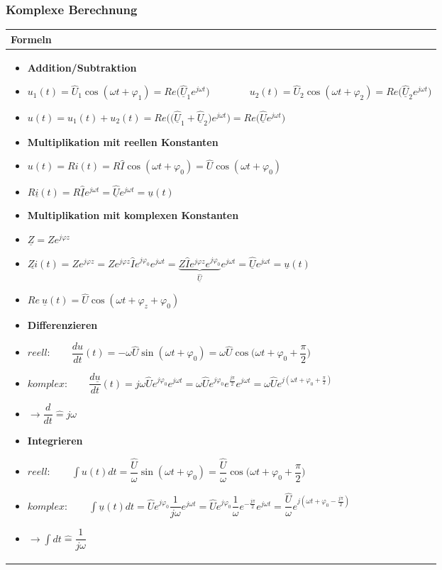 \subsubsection{Komplexe Berechnung}
\begin{tabular}{ | m{18cm}  | }
	\hline
	Formeln \\ \hline
	\hline
	
	\begin{itemize}	
		\item \textbf{Addition/Subtraktion}
		\item[] $u_1(t)=\hat{U}_1\cos(\omega t+\varphi_1)=Re\big(\underline{\hat{U}}_1e^{j\omega t}\big) \qquad \qquad u_2(t)=\hat{U}_2\cos(\omega t+\varphi_2)=Re\big(\underline{\hat{U}}_2e^{j\omega t}\big)$
		\item[] $u(t)=u_1(t)+u_2(t)=Re\big(\big(\underline{\hat{U}}_1+\underline{\hat{U}}_2\big)e^{j\omega t}\big)=Re\big(\underline{\hat{U}}e^{j\omega t}\big)$
		\item \textbf{Multiplikation mit reellen Konstanten}
		\item[] $u(t)=Ri(t)=R\hat{I}\cos(\omega t+\varphi_0)=\hat{U}\cos(\omega t+\varphi_0)$
		\item[] $R\underline{i}(t)=R\underline{\hat{I}}e^{j\omega t}=\underline{\hat{U}}e^{j\omega t}=\underline{u}(t)$
		\item \textbf{Multiplikation mit komplexen Konstanten}
		\item[] $\underline{Z}=Ze^{j\varphi z}$
		\item[] $\underline{Zi}(t)=Ze^{j\varphi z}=Ze^{j\varphi z}\hat{I}e^{j\varphi_0}e^{j\omega t}=\underbrace{Z\hat{I}e^{j\varphi z}e^{j\varphi_0}}_{\underline{\hat{U}}}e^{j\omega t}=\underline{\hat{U}}e^{j\omega t}=\underline{u}(t)$
		\item[] $Re\ \underline{u}(t)=\hat{U}\cos(\omega t+\varphi_z+\varphi_0)$
		\item \textbf{Differenzieren}
		\item[] $reell: \qquad \dfrac{du}{dt}(t)=-\omega\hat{U}\sin(\omega t+\varphi_0)=\omega\hat{U}\cos\big(\omega t+\varphi_0+\dfrac{\pi}{2}\big)$
		\item[] $komplex: \qquad \dfrac{d\underline{u}}{dt}(t)=j\omega\hat{U}e^{j\varphi_0}e^{j\omega t}=\omega\hat{U}e^{j\varphi_0}e^{\frac{j\pi}{2}}e^{j\omega t}=\omega \hat{U}e^{j(\omega t+\varphi_0+\frac{\pi}{2})}$
		\item[] $\rightarrow \dfrac{d}{dt}\hat{=}j\omega$
		\item \textbf{Integrieren}
		\item[] $reell: \qquad \displaystyle\int u(t)dt=\dfrac{\hat{U}}{\omega}\sin(\omega t+\varphi_0)=\dfrac{\hat{U}}{\omega}\cos\big(\omega t+\varphi_0+\dfrac{\pi}{2}\big)$
		\item[] $komplex: \qquad \displaystyle\int\underline{u}(t)dt=\hat{U}e^{j\varphi_0}\dfrac{1}{j\omega}e^{j\omega t}=\hat{U}e^{j\varphi_0}\dfrac{1}{\omega}e^{-\frac{j\pi}{2}}e^{j\omega t}=\dfrac{\hat{U}}{\omega}e^{j(\omega t+\varphi_0-\frac{j\pi}{2})}$
		\item[] $\rightarrow \displaystyle\int dt\hat{=}\dfrac{1}{j\omega}$
	\end{itemize}   	
	\\ \hline
\end{tabular}

